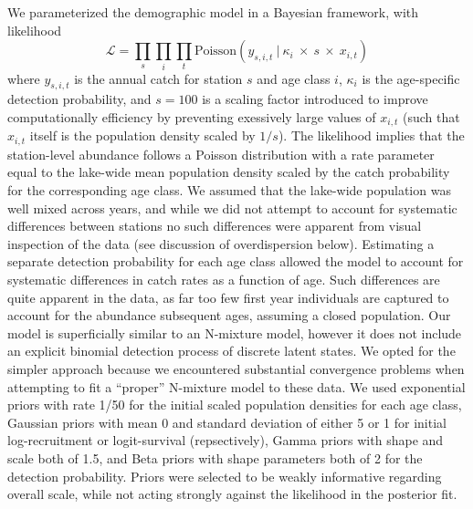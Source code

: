 We parameterized the demographic model in a Bayesian framework, with likelihood
%
\begin{equation} \label{eq:likelihood}
\mathcal{L} = 
\displaystyle\prod_{s}
\displaystyle\prod_{i}
\displaystyle\prod_{t}
\text{Poisson}
    \left(
        y_{s,i,t}~|~\kappa_i~\times~s~\times~x_{i,t}
    \right)
\end{equation}
%
where $y_{s,i,t}$ is the annual catch for station $s$ and age class $i$,
$\kappa_i$ is the age-specific detection probability,
and $s=100$ is a scaling factor introduced to improve computationally efficiency
by preventing exessively large values of $x_{i,t}$ 
(such that $x_{i,t}$ itself is the population density scaled by $1/s$).
The likelihood implies that the station-level abundance follows a Poisson distribution
with a rate parameter equal to the lake-wide mean population density 
scaled by the catch probability for the corresponding age class.
We assumed that the lake-wide population was well mixed across years,
and while we did not attempt to account for systematic differences between stations
no such differences were apparent from visual inspection of the data 
(see discussion of overdispersion below).
Estimating a separate detection probability for each age class allowed the model to account
for systematic differences in catch rates as a function of age.
Such differences are quite apparent in the data, 
as far too few first year individuals are captured to account for the abundance subsequent
ages, assuming a closed population. 
Our model is superficially similar to an N-mixture model, 
however it does not include an explicit binomial detection process of discrete latent states.
We opted for the simpler approach because we encountered substantial convergence problems
when attempting to fit a ``proper'' N-mixture model to these data.
We used exponential priors with rate 1/50 for the initial scaled population densities for
each age class, 
Gaussian priors with mean 0 and standard deviation of either 5 or 1 for 
initial log-recruitment or logit-survival (repsectively), 
Gamma priors with shape and scale both of 1.5,
and Beta priors with shape parameters both of 2 for the detection probability.
Priors were selected to be weakly informative regarding overall scale, 
while not acting strongly against the likelihood in the posterior fit.

